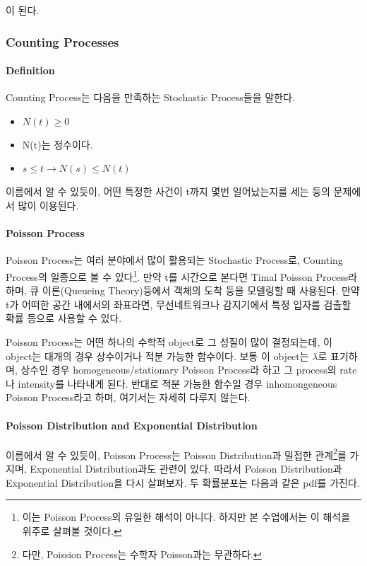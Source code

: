 \documentclass[twoside]{article}
\theoremstyle{definition}
\begin{document}
이 된다. 




\subsubsection{Counting Processes}

\paragraph{Definition} Counting Process는 다음을 만족하는 Stochastic Process들을 말한다. 

\begin{itemize} 
\item $N(t) \geq 0$ 
\item N(t)는 정수이다. 
\item $s \leq t \rightarrow N(s) \leq N(t)$ 
\end{itemize}

이름에서 알 수 있듯이, 어떤 특정한 사건이 t까지 몇번 일어났는지를 세는 등의 문제에서 많이 이용된다. 

\paragraph{Poisson Process} 

Poisson Process는 여러 분야에서 많이 활용되는 Stochastic Process로, Counting Process의 일종으로 볼 수 있다\footnote{이는 Poisson Process의 유일한 해석이 아니다. 하지만 본 수업에서는 이 해석을 위주로 살펴볼 것이다.}. 만약 t를 시간으로 본다면 Timal Poisson Process라 하며, 큐 이론(Queueing Theory)등에서 객체의 도착 등을 모델링할 때 사용된다. 만약 t가 어떠한 공간 내에서의 좌표라면, 무선네트워크나 감지기에서 특정 입자를 검출할 확률 등으로 사용할 수 있다. 

Poisson Process는 어떤 하나의 수학적 object로 그 성질이 많이 결정되는데, 이 object는  대개의 경우 상수이거나 적분 가능한 함수이다. 보통 이 object는 $\lambda$로 표기하며, 상수인 경우 homogeneous/stationary Poisson Process라 하고 그 process의 rate나 intensity를 나타내게 된다. 반대로 적분 가능한 함수일 경우 inhomongeneous Poisson Process라고 하며, 여기서는 자세히 다루지 않는다. 

\paragraph{Poisson Distribution and Exponential Distribution} 

이름에서 알 수 있듯이, Poisson Process는 Poisson Distribution과 밀접한 관계\footnote{다만, Poission Process는 수학자 Poisson과는 무관하다.}를 가지며, Exponential Distribution과도 관련이 있다. 따라서 Poisson Distribution과 Exponential Distribution을 다시 살펴보자. 두 확률분포는 다음과 같은 pdf를 가진다. 
\end{document}
